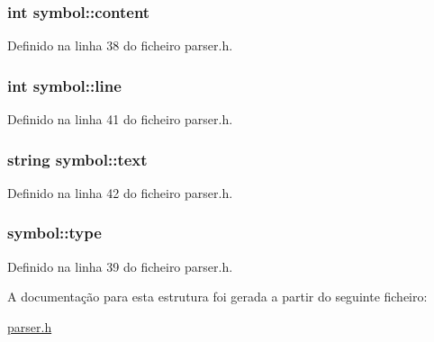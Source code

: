 \hypertarget{structsymbol_a72c61f7152e8fadf84f1d13136ba741b}{
\subsubsection[{content}]{\setlength{\rightskip}{0pt plus 5cm}int symbol\-::content}}\label{structsymbol_a72c61f7152e8fadf84f1d13136ba741b}


Definido na linha 38 do ficheiro parser.\-h.

\hypertarget{structsymbol_a9080179a3d7c5bbfaf9de1817f00c2c7}{
\subsubsection[{line}]{\setlength{\rightskip}{0pt plus 5cm}int symbol\-::line}}\label{structsymbol_a9080179a3d7c5bbfaf9de1817f00c2c7}


Definido na linha 41 do ficheiro parser.\-h.

\hypertarget{structsymbol_ad8fc4d46c20c78f051903a5d06151e86}{
\subsubsection[{text}]{\setlength{\rightskip}{0pt plus 5cm}string symbol\-::text}}\label{structsymbol_ad8fc4d46c20c78f051903a5d06151e86}


Definido na linha 42 do ficheiro parser.\-h.

\hypertarget{structsymbol_adba0eaeb4bfbf4787bd3899e4202cc90}{
\subsubsection[{type}]{ symbol\-::type}}\label{structsymbol_adba0eaeb4bfbf4787bd3899e4202cc90}


Definido na linha 39 do ficheiro parser.\-h.



A documentação para esta estrutura foi gerada a partir do seguinte ficheiro\-:\begin{DoxyCompactItemize}
\item 
\hyperlink{parser_8h}{parser.\-h}\end{DoxyCompactItemize}
